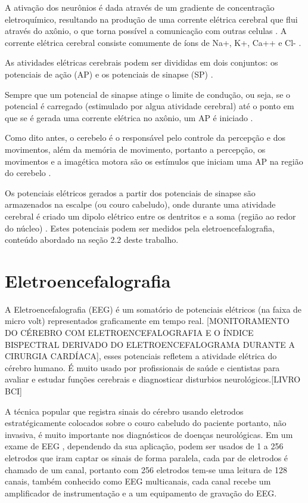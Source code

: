 A ativação dos neurônios é dada através de um gradiente de concentração eletroquímico, resultando na produção de uma corrente elétrica cerebral que flui através do axônio, o que torna possível a comunicação com outras celulas \cite{SIULYDissertacao}. A corrente elétrica cerebral consiste comumente de íons de Na+, K+, Ca++ e Cl- \cite{EEGSignals}.

As atividades elétricas cerebrais podem ser divididas em dois conjuntos: os potenciais de ação (AP) e os potenciais de sinapse (SP) \cite{SIULYDissertacao}.

Sempre que um potencial de sinapse atinge o limite de condução, ou seja, se o potencial é carregado (estimulado por algua atividade cerebral) até o ponto em que se é gerada uma corrente elétrica no axônio, um AP é iniciado \cite{SIULYDissertacao}.

Como dito antes, o cerebelo é o responsável pelo controle da percepção e dos movimentos, além da memória de movimento, portanto a percepção, os movimentos e a imagética motora são os estímulos que iniciam uma AP na região do cerebelo \cite{alvarezneurobiomecanismos}.

Os potenciais elétricos gerados a partir dos potenciais de sinapse são armazenados na escalpe (ou couro cabeludo), onde durante uma atividade cerebral é criado um dipolo elétrico entre os dentritos e a soma (região ao redor do núcleo) \cite{SYULYDissertacao}. Estes potenciais podem ser medidos pela eletroencefalografia, conteúdo abordado na seção 2.2 deste trabalho.

\section{Eletroencefalografia}
A Eletroencefalografia (EEG) é um somatório de potenciais elétricos
 (na faixa de micro volt) representados graficamente em tempo real.
 [MONITORAMENTO DO CÉREBRO COM ELETROENCEFALOGRAFIA E O ÍNDICE BISPECTRAL
 DERIVADO DO ELETROENCEFALOGRAMA DURANTE A CIRURGIA CARDÍACA], esses potenciais
 refletem a atividade elétrica do cérebro humano. É muito usado por profissionais
 de saúde e cientistas para avaliar e estudar funções cerebrais e diagnosticar
 disturbios neurológicos.[LIVRO BCI] 

A técnica popular que registra sinais do cérebro usando eletrodos estratégicamente
 colocados sobre o couro cabeludo do paciente portanto, não invasiva, é muito
 importante nos diagnósticos de doenças neurológicas. Em um exame de EEG ,
 dependendo da sua aplicação, podem ser usados de 1 a 256 eletrodos que iram
 captar os sinais de forma paralela, cada par de eletrodos é chamado de um canal,
 portanto com 256 eletrodos tem-se uma leitura de 128 canais, também conhecido como
 EEG multicanais, cada canal recebe um amplificador de instrumentação e a um equipamento
 de gravação do EEG.

